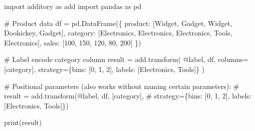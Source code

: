 \documentclass[
  letterpaper,
]{scrbook}
\newenvironment{Shaded}{\begin{snugshade}}{\end{snugshade}}
\newcommand{\BuiltInTok}[1]{\textcolor[rgb]{0.00,0.23,0.31}{#1}}
\newcommand{\CommentTok}[1]{\textcolor[rgb]{0.37,0.37,0.37}{#1}}
\newcommand{\DecValTok}[1]{\textcolor[rgb]{0.68,0.00,0.00}{#1}}
\newcommand{\ImportTok}[1]{\textcolor[rgb]{0.00,0.46,0.62}{#1}}
\newcommand{\NormalTok}[1]{\textcolor[rgb]{0.00,0.23,0.31}{#1}}
\newcommand{\OperatorTok}[1]{\textcolor[rgb]{0.37,0.37,0.37}{#1}}
\newcommand{\StringTok}[1]{\textcolor[rgb]{0.13,0.47,0.30}{#1}}
\begin{document}
\begin{Shaded}
\begin{Highlighting}[]
\ImportTok{import}\NormalTok{ additory }\ImportTok{as}\NormalTok{ add}
\ImportTok{import}\NormalTok{ pandas }\ImportTok{as}\NormalTok{ pd}

\CommentTok{\# Product data}
\NormalTok{df }\OperatorTok{=}\NormalTok{ pd.DataFrame(\{}
    \StringTok{\textquotesingle{}product\textquotesingle{}}\NormalTok{: [}\StringTok{\textquotesingle{}Widget\textquotesingle{}}\NormalTok{, }\StringTok{\textquotesingle{}Gadget\textquotesingle{}}\NormalTok{, }\StringTok{\textquotesingle{}Widget\textquotesingle{}}\NormalTok{, }\StringTok{\textquotesingle{}Doohickey\textquotesingle{}}\NormalTok{, }\StringTok{\textquotesingle{}Gadget\textquotesingle{}}\NormalTok{],}
    \StringTok{\textquotesingle{}category\textquotesingle{}}\NormalTok{: [}\StringTok{\textquotesingle{}Electronics\textquotesingle{}}\NormalTok{, }\StringTok{\textquotesingle{}Electronics\textquotesingle{}}\NormalTok{, }\StringTok{\textquotesingle{}Electronics\textquotesingle{}}\NormalTok{, }\StringTok{\textquotesingle{}Tools\textquotesingle{}}\NormalTok{, }\StringTok{\textquotesingle{}Electronics\textquotesingle{}}\NormalTok{],}
    \StringTok{\textquotesingle{}sales\textquotesingle{}}\NormalTok{: [}\DecValTok{100}\NormalTok{, }\DecValTok{150}\NormalTok{, }\DecValTok{120}\NormalTok{, }\DecValTok{80}\NormalTok{, }\DecValTok{200}\NormalTok{]}
\NormalTok{\})}

\CommentTok{\# Label encode category column}
\NormalTok{result }\OperatorTok{=}\NormalTok{ add.transform(}
    \StringTok{\textquotesingle{}@label\textquotesingle{}}\NormalTok{,}
\NormalTok{    df,}
\NormalTok{    columns}\OperatorTok{=}\NormalTok{[}\StringTok{\textquotesingle{}category\textquotesingle{}}\NormalTok{],}
\NormalTok{    strategy}\OperatorTok{=}\NormalTok{\{}\StringTok{\textquotesingle{}bins\textquotesingle{}}\NormalTok{: [}\DecValTok{0}\NormalTok{, }\DecValTok{1}\NormalTok{, }\DecValTok{2}\NormalTok{], }\StringTok{\textquotesingle{}labels\textquotesingle{}}\NormalTok{: [}\StringTok{\textquotesingle{}Electronics\textquotesingle{}}\NormalTok{, }\StringTok{\textquotesingle{}Tools\textquotesingle{}}\NormalTok{]\}}
\NormalTok{)}

\CommentTok{\# Positional parameters (also works without naming certain parameters):}
\CommentTok{\# result = add.transform(\textquotesingle{}@label\textquotesingle{}, df, [\textquotesingle{}category\textquotesingle{}], }
\CommentTok{\#                        strategy=\{\textquotesingle{}bins\textquotesingle{}: [0, 1, 2], \textquotesingle{}labels\textquotesingle{}: [\textquotesingle{}Electronics\textquotesingle{}, \textquotesingle{}Tools\textquotesingle{}]\})}

\BuiltInTok{print}\NormalTok{(result)}
\end{Highlighting}
\end{Shaded}
\end{document}
